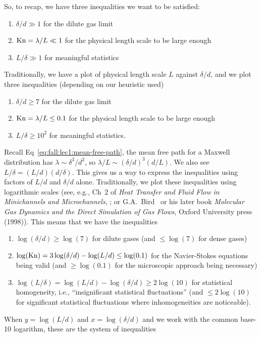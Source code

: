 \begin{node}
So, to recap, we have three inequalities we want to be satisfied:
\begin{enumerate}
\item $\delta/d\gg1$ for the dilute gas limit
\item $\mathrm{Kn}=\lambda/L\ll1$ for the physical length scale to be large enough
\item $L/\delta\gg1$ for meaningful statistics
\end{enumerate}
Traditionally, we have a plot of physical length scale $L$ against
$\delta/d$, and we plot three inequalities (depending on our heuristic
used)
\begin{enumerate}
\item $\delta/d\geq7$ for the dilute gas limit
\item $\mathrm{Kn}=\lambda/L\leq0.1$ for the physical length scale to be large enough
\item $L/\delta\geq10^{2}$ for meaningful statistics.
\end{enumerate}
Recall Eq~\eqref{eq:fall:lec1:mean-free-path}, the mean free path for
a Maxwell distribution has $\lambda\sim\delta^{3}/d^{2}$, so
$\lambda/L\sim(\delta/d)^{3}(d/L)$. We also see $L/\delta=(L/d)(d/\delta)$.
This gives us a way to express the inequalities using factors of $L/d$
and $\delta/d$ alone. Traditionally, we plot these inequalities
using logarithmic scales (see, e.g., Ch~2 of \textit{Heat Transfer and Fluid Flow in Minichannels and Microchannels},
; or G.A.~Bird~\cite[Fig~1.6]{bird1976molecular}
or his later book \textit{Molecular Gas Dynamics and the Direct Simulation of Gas Flows}, Oxford University
press (1998)). This means that we have the inequalities
\begin{enumerate}
\item $\log(\delta/d)\geq\log(7)$ for dilute gases (and $\leq\log(7)$
for dense gases)
\item $\log(\mathrm{Kn})=3\log(\delta/d)-\log(L/d)\leq\log(0.1)$ for the
Navier-Stokes equations being valid (and $\geq\log(0.1)$ for the
microscopic approach being necessary)
\item $\log(L/\delta)=\log(L/d)-\log(\delta/d)\geq2\log(10)$ for
statistical homogeneity, i.e., ``insignificant statistical fluctuations''
(and $\leq2\log(10)$ for significant statistical fluctuations where
inhomogeneities are noticeable). 
\end{enumerate}
When $y=\log(L/d)$ and $x=\log(\delta/d)$ and we work with the common
base-10 logarithm, these are the system of inequalities

\end{node}
